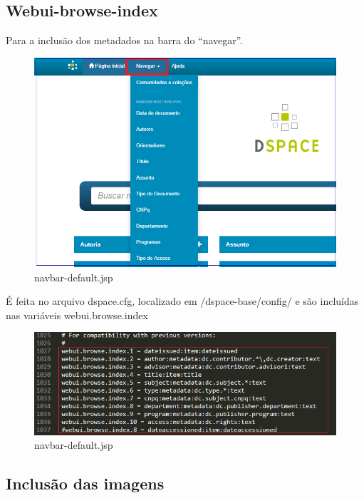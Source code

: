 \documentclass[12pt,hidelinks]{article}
\begin{document}
\subsection{Webui-browse-index}

Para a inclusão dos metadados na barra do “navegar”. 

    \begin{figure}[!htp]
        \centering
        \includegraphics[scale=0.5]{figura/navegar1.png}
        \caption{navbar-default.jsp}
        \label{Rotulo}
     \end{figure}



É feita no arquivo dspace.cfg, localizado em /dspace-base/config/ e são incluídas nas variáveis webui.browse.index


    \begin{figure}[!htp]
        \centering
        \includegraphics[scale=0.5]{figura/webui-browse-index.png}
        \caption{navbar-default.jsp}
        \label{Rotulo}
    \end{figure}
 
\newpage
\subsection{Inclusão das imagens}
       
\end{document}
